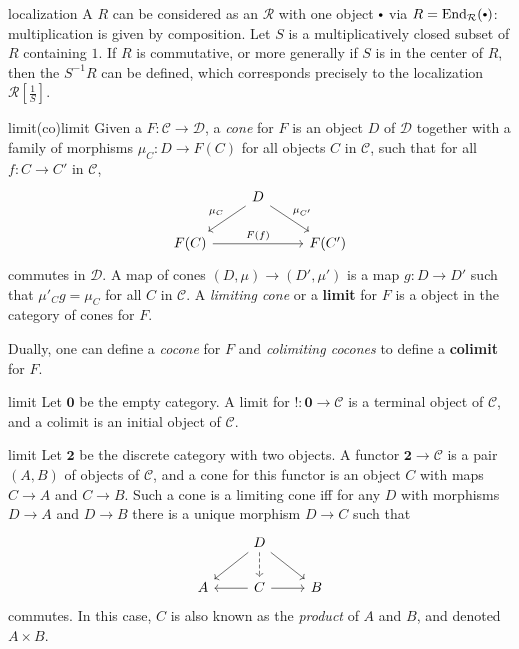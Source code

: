 \begin{example}{localization}
    A  $R$ can be considered as an  $\mathcal{R}$ with one object $\bdot$ via $R = \text{End}_\mathcal{R}(\bdot)$: multiplication is given by composition. Let $S$ is a multiplicatively closed subset of $R$ containing $1$. If $R$ is commutative, or more generally if $S$ is in the center of $R$, then the  $S^{-1} R$ can be defined, which corresponds precisely to the localization $\mathcal{R}\left[\frac{1}{S}\right]$.
\end{example}

\begin{topic}{limit}{(co)limit}
    Given a  $F : \mathcal{C} \to \mathcal{D}$, a \textit{cone} for $F$ is an object $D$ of $\mathcal{D}$ together with a family of morphisms $\mu_C : D \to F(C)$ for all objects $C$ in $\mathcal{C}$, such that for all $f : C \to C'$ in $\mathcal{C}$,
    \[ \begin{tikzcd} & D \arrow[swap]{ld}{\mu_C} \arrow{rd}{\mu_{C'}} & \\ F(C) \arrow{rr}{F(f)} && F(C') \end{tikzcd} \]
    commutes in $\mathcal{D}$. A map of cones $(D, \mu) \to (D', \mu')$ is a map $g : D \to D'$ such that $\mu'_C g = \mu_C$ for all $C$ in $\mathcal{C}$. A \textit{limiting cone} or a \textbf{limit} for $F$ is a  object in the category of cones for $F$.
    
    Dually, one can define a \textit{cocone} for $F$ and \textit{colimiting cocones} to define a \textbf{colimit} for $F$.
\end{topic}

\begin{example}{limit}
    Let $\textbf{0}$ be the empty category. A limit for $! : \textbf{0} \to \mathcal{C}$ is a terminal object of $\mathcal{C}$, and a colimit is an initial object of $\mathcal{C}$.
\end{example}

\begin{example}{limit}
    Let $\textbf{2}$ be the discrete category with two objects. A functor $\textbf{2} \to \mathcal{C}$ is a pair $(A, B)$ of objects of $\mathcal{C}$, and a cone for this functor is an object $C$ with maps $C \to A$ and $C \to B$. Such a cone is a limiting cone iff for any $D$ with morphisms $D \to A$ and $D \to B$ there is a unique morphism $D \to C$ such that
    \[ \begin{tikzcd} & D \arrow[dashed]{d} \arrow{ld} \arrow{rd} & \\ A & \arrow{l} C \arrow{r} & B \end{tikzcd} \]
    commutes. In this case, $C$ is also known as the \textit{product} of $A$ and $B$, and denoted $A \times B$.
\end{example}

